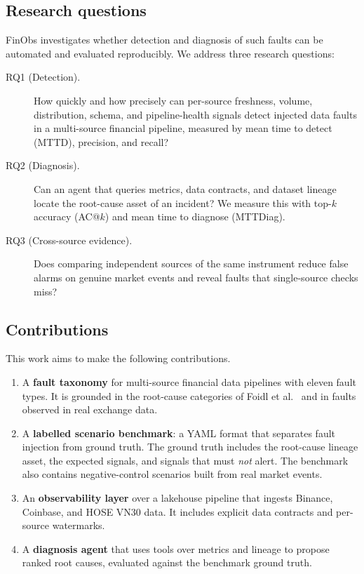 \subsection{Research questions}

FinObs investigates whether detection and diagnosis of such faults can be
automated and evaluated reproducibly. We address three research questions:
\begin{description}
  \item[RQ1 (Detection).] How quickly and how precisely can per-source freshness,
        volume, distribution, schema, and pipeline-health signals detect injected
        data faults in a multi-source financial pipeline, measured by mean time to
        detect (MTTD), precision, and recall?
  \item[RQ2 (Diagnosis).] Can an agent that queries metrics, data contracts, and
        dataset lineage locate the root-cause asset of an incident? We measure this
        with top-$k$ accuracy (AC@$k$) and mean time to diagnose (MTTDiag).
  \item[RQ3 (Cross-source evidence).] Does comparing independent sources of the
        same instrument reduce false alarms on genuine market events and reveal
        faults that single-source checks miss?
\end{description}

\subsection{Contributions}

This work aims to make the following contributions.
\begin{enumerate}
  \item A \textbf{fault taxonomy} for multi-source financial data pipelines with
        eleven fault types. It is grounded in the root-cause categories of Foidl
        et al.~\cite{foidl2023pipeline} and in faults observed in real exchange data.
  \item A \textbf{labelled scenario benchmark}: a YAML format that separates fault
        injection from ground truth. The ground truth includes the root-cause
        lineage asset, the expected signals, and signals that must \emph{not}
        alert. The benchmark also contains negative-control scenarios built from
        real market events.
  \item An \textbf{observability layer} over a lakehouse pipeline that ingests
        Binance, Coinbase, and HOSE VN30 data. It includes explicit data contracts
        and per-source watermarks.
  \item A \textbf{diagnosis agent} that uses tools over metrics and lineage to
        propose ranked root causes, evaluated against the benchmark ground truth.
\end{enumerate}

